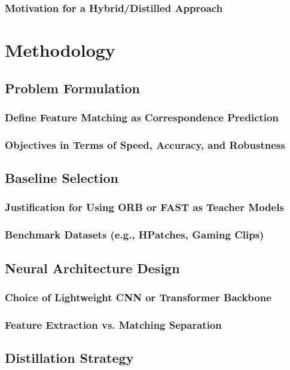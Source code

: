 \documentclass[a4paper,12pt]{report}
\begin{document}
\subsection{Motivation for a Hybrid/Distilled Approach}

\chapter{Methodology}
\section{Problem Formulation}
\subsection{Define Feature Matching as Correspondence Prediction}
\subsection{Objectives in Terms of Speed, Accuracy, and Robustness}

\section{Baseline Selection}
\subsection{Justification for Using ORB or FAST as Teacher Models}
\subsection{Benchmark Datasets (e.g., HPatches, Gaming Clips)}

\section{Neural Architecture Design}
\subsection{Choice of Lightweight CNN or Transformer Backbone}
\subsection{Feature Extraction vs. Matching Separation}

\section{Distillation Strategy}
\end{document}
